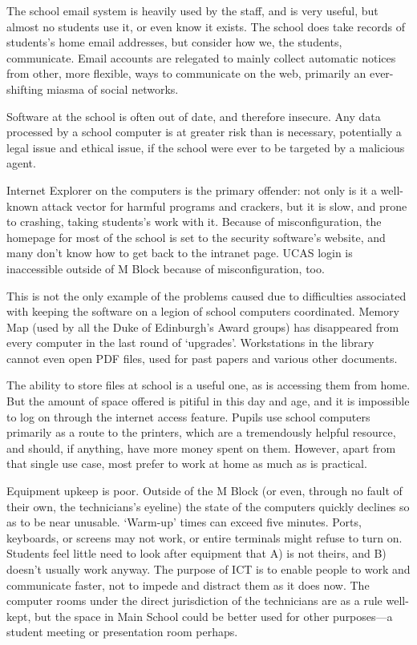 \documentclass[a4paper,leqno,titlepage]{article}
\begin{document}
The school email system is heavily used by the staff, and is very useful, but
almost no students use it, or even know it exists. The school does take records
of students's home email addresses, but consider how we, the students,
communicate. Email accounts are relegated to mainly collect automatic notices
from other, more flexible, ways to communicate on the web, primarily an
ever-shifting miasma of social networks.


Software at the school is often out of date, and therefore insecure.
Any data processed by a school computer is at greater risk than is necessary,
potentially a legal issue and ethical issue, if the school were ever to be
targeted by a malicious agent.


Internet Explorer on the computers is the primary offender: not only is it
a well-known attack vector for harmful programs and crackers, but it is slow, and
prone to crashing, taking students's work with it. Because of misconfiguration,
the homepage for most of the school is set to the security software's website,
and many don't know how to get back to the intranet page. UCAS login is
inaccessible outside of M Block because of misconfiguration, too.


This is not the only example of the problems caused due to difficulties
associated with keeping the software on a legion of school computers
coordinated. Memory Map (used by all the Duke of Edinburgh's Award groups) has
disappeared from every computer in the last round of `upgrades'. Workstations
in the library cannot even open PDF files, used for past papers and various
other documents.

The ability to store files at school is a useful one, as is accessing them from
home. But the amount of space offered is pitiful in this day and age, and it is
impossible to log on through the internet access feature.
Pupils use school computers primarily as a route to the printers, which are a
tremendously helpful resource, and should, if anything, have more money spent on them.
However, apart from that single use case,
most prefer to work at home as much as is practical.


Equipment upkeep is poor. Outside of the M Block (or even, through no fault of
their own, the technicians's eyeline) the state of the computers quickly declines
so as to be near unusable. `Warm-up' times can exceed five minutes. Ports, keyboards,
or screens may not work, or entire terminals might refuse to turn on.
Students feel little need to look after equipment that A) is not theirs,
and B) doesn't usually work anyway. The purpose of ICT is to enable
people to work and communicate faster, not to impede and distract them as it
does now. The computer rooms under the direct jurisdiction of the
technicians are as a rule well-kept, but the space in Main School could be
better used for other purposes---a student meeting or presentation room perhaps.
\end{document}
